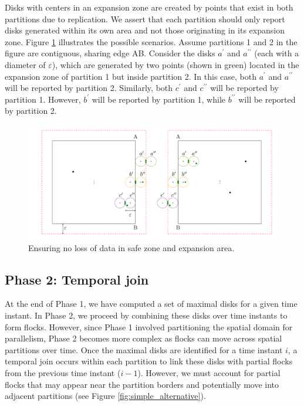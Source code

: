 Disks with centers in an expansion zone are created by points that exist in both partitions due to replication. We assert that each partition should only report disks generated within its own area and not those originating in its expansion zone. Figure \ref{fig:ensuring} illustrates the possible scenarios. Assume partitions 1 and 2 in the figure are contiguous, sharing edge AB. Consider the disks $a^\prime$ and $a^{\prime\prime}$ (each with a diameter of $\varepsilon$), which are generated by two points (shown in green) located in the expansion zone of partition 1 but inside partition 2. In this case, both $a^\prime$ and $a^{\prime\prime}$ will be reported by partition 2. Similarly, both $c^\prime$ and $c^{\prime\prime}$ will be reported by partition 1. However, $b^\prime$ will be reported by partition 1, while $b^{\prime\prime}$ will be reported by partition 2.

\begin{figure}
    \centering
    \includegraphics[width=\linewidth]{figures/merge.pdf}
    \caption{Ensuring no loss of data in safe zone and expansion area.}\label{fig:ensuring}
\end{figure}

\subsection{Phase 2: Temporal join}\label{sec:temporal_join}
At the end of Phase 1, we have computed a set of maximal disks for a given time instant. In Phase 2, we proceed by combining these disks over time instants to form flocks. However, since Phase 1 involved partitioning the spatial domain for parallelism, Phase 2 becomes more complex as flocks can move across spatial partitions over time. Once the maximal disks are identified for a time instant $i$, a temporal join occurs within each partition to link these disks with partial flocks from the previous time instant ($i-1$). However, we must account for partial flocks that may appear near the partition borders and potentially move into adjacent partitions (see Figure \ref{fig:simple_alternative}).


